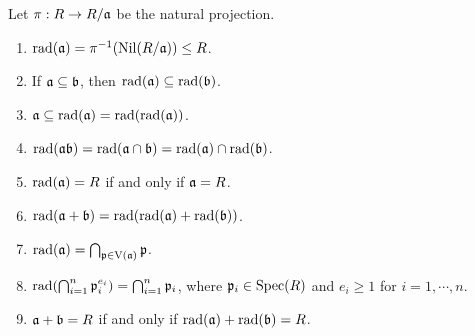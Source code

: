 \begin{fact}\label{1.58}
    Let $\pi: R \to R/\mathfrak{a}$ be the natural projection.
    \begin{enumerate}
        \item\label{1.58a} $\operatorname{rad}(\mathfrak{a}) = \pi^{-1}(\operatorname{Nil}(R/\mathfrak{a})) \leq R$. 
        \item\label{1.58b} If $\mathfrak{a} \subseteq \mathfrak{b}$, then $\operatorname{rad}(\mathfrak{a}) \subseteq \operatorname{rad}(\mathfrak{b})$. 
        \item\label{1.58c} $\mathfrak{a} \subseteq \operatorname{rad}(\mathfrak{a}) = \operatorname{rad}(\operatorname{rad}(\mathfrak{a}))$. 
        \item\label{1.58d} $\operatorname{rad}(\mathfrak{a}\mathfrak{b}) = \operatorname{rad}(\mathfrak{a} \cap \mathfrak{b}) = \operatorname{rad}(\mathfrak{a}) \cap \operatorname{rad}(\mathfrak{b})$.
        \item\label{1.58e} $\operatorname{rad}(\mathfrak{a}) = R$ if and only if $\mathfrak{a} = R$.
        \item\label{1.58f} $\operatorname{rad}(\mathfrak{a} + \mathfrak{b}) = \operatorname{rad}(\operatorname{rad}(\mathfrak{a}) + \operatorname{rad}(\mathfrak{b}))$.
        \item\label{1.58g} $\operatorname{rad}(\mathfrak{a}) = \bigcap_{\mathfrak{p} \in \operatorname{V}(\mathfrak{a})} \mathfrak{p}$. 
        \item\label{1.58h} $\operatorname{rad}(\bigcap_{i=1}^n \mathfrak{p}_i^{e_i}) = \bigcap_{i=1}^n \mathfrak{p}_i$, where $\mathfrak{p}_i \in \operatorname{Spec}(R)$ and $e_i \geq 1$ for $i = 1,\cdots,n$.
        \item\label{1.58i} $\mathfrak{a} + \mathfrak{b} = R$ if and only if $\operatorname{rad}(\mathfrak{a}) + \operatorname{rad}(\mathfrak{b}) = R$. 
    \end{enumerate}
\end{fact}

